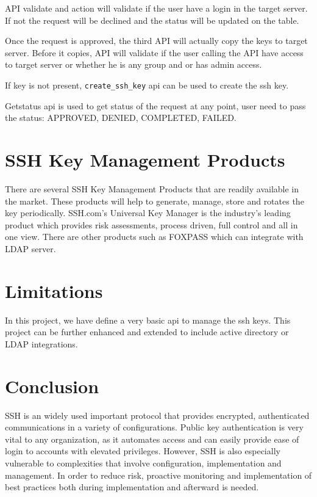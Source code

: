 API validate and action will validate if the user have a 
login in the target server. If not the request will be declined
and the status will be updated on the table.

Once the request is approved, the third API will actually copy
the keys to target server. Before it copies, API will validate
if the user calling the API have access to target server or
whether he is any group and or has admin access. 

If key is not present, \verb|create_ssh_key| api can be used to
create the ssh key.

Getstatus api is used to get status of the request at any point,
user need to pass the status: APPROVED, DENIED, COMPLETED, FAILED.

\section{SSH Key Management Products}

There are several SSH Key Management Products that are readily available
in the market. These products will help to generate, manage, store and
rotates the key periodically. SSH.com's Universal Key Manager is the
industry's leading product which provides risk assessments, process driven,
full control and all in one view. There are other products such as 
FOXPASS which can integrate with LDAP server.

\section{Limitations}

In this project, we have define a very basic api to manage the ssh keys.
This project can be further enhanced and extended to include active directory 
or LDAP integrations.


\section{Conclusion}

SSH is an widely used important protocol that provides encrypted, 
authenticated communications in a variety of configurations. Public key
authentication is very vital to any organization, as it automates 
access and can easily provide ease of login to accounts with elevated 
privileges. However, SSH is also especially vulnerable to complexities
that involve configuration, implementation and management. In order to
reduce risk, proactive monitoring and implementation of best practices 
both during implementation and afterward is needed. 

